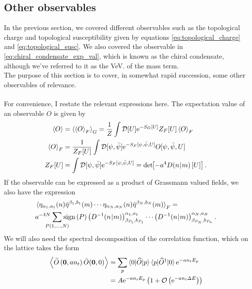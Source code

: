 \documentclass[a4paper,10pt]{article}
\begin{document}
\subsection{Other observables}
In the previous section, we covered different observables such as the topological charge and topological susceptibility given by equations \eqref{eq:topological_charge} and \eqref{eq:topological_susc}. We also covered the observable in \eqref{eq:chiral_condensate_exp_val}, which is known as the chiral condensate, although we've referred to it as the VeV. of the mass term.\\The purpose of this section is to cover, in somewhat rapid succession, some other observables of relevance.\\\\For convenience, I restate the relevant expressions here. The expectation value of an observable $O$ is given by
\begin{equation}\label{eq:exp_val_collection}
\begin{aligned}
\braket{O}&=\braket{\braket{O}_{F}}_G=\frac{1}{Z} \int \mathcal{D}[U] \mathrm{e}^{-S_{G}[U]} Z_{F}[U] \braket{O}_{F}\\
\braket{O}_{F}&=\frac{1}{Z_{F}[U]} \int \mathcal{D}[\psi, \bar{\psi}] \mathrm{e}^{-S_{F}[\psi, \bar{\psi}, U]} O[\psi, \bar{\psi}, U]\\
Z_{F}[U]&=\int \mathcal{D}[\psi, \bar{\psi}] \mathrm{e}^{-S_{F}[\psi, \bar{\psi}, U]}=\operatorname{det}\mkern-5mu\left[ -a^4D(n\mkern-4mu\mid \mkern-4mu m)\left[ U \right] \right].
\end{aligned}
\end{equation}
If the observable can be expressed as a product of Grassmann valued fields, we also have the expression
\begin{equation}\label{eq:new_Wick_Theorem}
\begin{aligned}
&\braket{\eta_{\alpha_1,a_1}(n)\bar{\eta}^{\beta_1,b_1}(m)\cdots\eta_{\alpha_N,a_N}(n)\bar{\eta}^{\beta_N,b_N}(m)}_F = \\&a^{-4N} \mkern-18mu\sum\limits_{P(1,\ldots,N)}\mkern-18mu\operatorname{sign}\left( P \right)\left( D^{-1}(n\mkern-4mu\mid \mkern-4mu m) \right)_{\beta_{P_1},b_{P_1}}^{\alpha_1,a_1}\cdots\left( D^{-1}(n\mkern-4mu\mid \mkern-4mu m) \right)_{\beta_{P_N},b_{P_n}}^{\alpha_N,a_N}.
\end{aligned}
\end{equation}
We will also need the spectral decomposition of the correlation function, which on the lattice takes the form
\begin{equation}\label{eq:corr_function_for_hadron_masses}
\begin{aligned} 
\left\langle\widetilde{O}\left(\mathbf{0}, an_{t}\right) \bar{O}(\mathbf{0}, 0)\right\rangle&=\sum_{p}\braket{0|\widehat{O}| p}\braket{p|\widehat{O}^{\dagger}| 0} \mathrm{e}^{-an_{t} E_{p}}\\
&=A \mathrm{e}^{-a n_{t} E_p}\left(1+\mathcal{O}\left(\mathrm{e}^{-a n_{t} \Delta E}\right)\right)
\end{aligned}
\end{equation}
\end{document}
